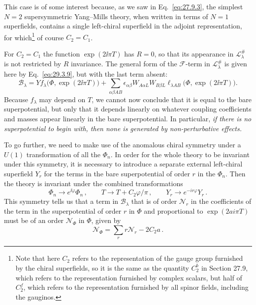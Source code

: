 This case is of some interest because, as we saw in
Eq.~\eqref{eq:27.9.3}, the simplest \(N=2\) supersymmetric Yang--Mills
theory, when written in terms of \(N=1\) superfields, contains a single
left-chiral superfield in the adjoint representation, for
which\footnote{Note that here \(C_2\) refers to the representation of the
gauge group furnished by the chiral superfields, so it is the same as the
quantity \(C_2^b\) in Section 27.9, which refers to the representation
furnished by complex scalars, but half of \(C_2^f\), which refers to the
representation furnished by all spinor fields, including the gauginos.}
of course \(C_2=C_1\).

For \(C_2=C_1\) the function \(\exp(2\ii\pi T)\) has \(R=0\), so that its
appearance in \(\mathcal{L}^{\#}_\lambda\) is not restricted by \(R\)
invariance. The general form of the \(\mathcal{F}\)-term in
\(\mathcal{L}^{\#}_\lambda\) is given here by Eq.~\eqref{eq:29.3.9}, but
with the last term absent:
\begin{equation}
  \mathcal{B}_\lambda
  =
  Yf_\lambda\bigl(\Phi,\exp(2\ii\pi T)\bigr)
  +\sum_{\alpha\beta AB}
  \epsilon_{\alpha\beta}W_{A\alpha L}W_{B\beta L}
  \ell_{\lambda AB}\bigl(\Phi,\exp(2\ii\pi T)\bigr).
  \tag{29.3.32}\label{eq:29.3.32}
\end{equation}
Because \(f_\lambda\) may depend on \(T\), we cannot now conclude that it
is equal to the bare superpotential, but only that it depends linearly on
whatever coupling coefficients and masses appear linearly in the bare
superpotential. In particular, \emph{if there is no superpotential to
begin with, then none is generated by non-perturbative effects.}

To go further, we need to make use of the anomalous chiral symmetry under a
\(U(1)\) transformation of all the \(\Phi_n\). In order for the whole
theory to be invariant under this symmetry, it is necessary to introduce a
separate external left-chiral superfield \(Y_r\) for the terms in the bare
superpotential of order \(r\) in the \(\Phi_n\). Then the theory is
invariant under the combined transformations
\begin{equation}
  \Phi_n\longrightarrow e^{\ii\varphi}\Phi_n\,,
  \qquad
  T\longrightarrow T+C_2\varphi/\pi\,,
  \qquad
  Y_r\longrightarrow e^{-ir\varphi}Y_r\,.
  \tag{29.3.33}\label{eq:29.3.33}
\end{equation}
This symmetry tells us that a term in \(\mathcal{B}_\lambda\) that is of
order \(\mathcal{N}_r\) in the coefficients of the term in the
superpotential of order \(r\) in \(\Phi\) and proportional to
\(\exp(2ai\pi T)\) must be of an order \(\mathcal{N}_\Phi\) in \(\Phi\),
given by
\begin{equation}
  \mathcal{N}_\Phi
  =
  \sum_r r\mathcal{N}_r-2C_2a\,.
  \tag{29.3.34}\label{eq:29.3.34}
\end{equation}

